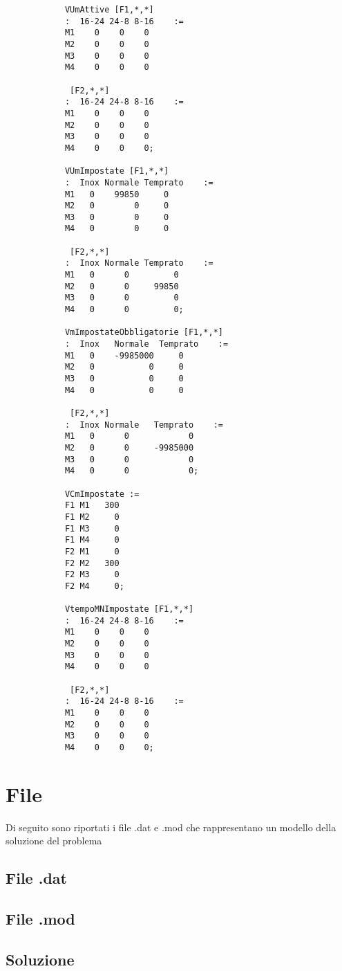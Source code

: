 \documentclass[12pt]{article} %
\begin{document}
\begin{lstlisting}
			VUmAttive [F1,*,*]
			:  16-24 24-8 8-16    :=
			M1    0    0    0
			M2    0    0    0
			M3    0    0    0
			M4    0    0    0

			 [F2,*,*]
			:  16-24 24-8 8-16    :=
			M1    0    0    0
			M2    0    0    0
			M3    0    0    0
			M4    0    0    0;

			VUmImpostate [F1,*,*]
			:  Inox Normale Temprato    :=
			M1   0    99850     0
			M2   0        0     0
			M3   0        0     0
			M4   0        0     0

			 [F2,*,*]
			:  Inox Normale Temprato    :=
			M1   0      0         0
			M2   0      0     99850
			M3   0      0         0
			M4   0      0         0;

			VmImpostateObbligatorie [F1,*,*]
			:  Inox   Normale  Temprato    :=
			M1   0    -9985000     0
			M2   0           0     0
			M3   0           0     0
			M4   0           0     0

			 [F2,*,*]
			:  Inox Normale   Temprato    :=
			M1   0      0            0
			M2   0      0     -9985000
			M3   0      0            0
			M4   0      0            0;

			VCmImpostate :=
			F1 M1   300
			F1 M2     0
			F1 M3     0
			F1 M4     0
			F2 M1     0
			F2 M2   300
			F2 M3     0
			F2 M4     0;

			VtempoMNImpostate [F1,*,*]
			:  16-24 24-8 8-16    :=
			M1    0    0    0
			M2    0    0    0
			M3    0    0    0
			M4    0    0    0

			 [F2,*,*]
			:  16-24 24-8 8-16    :=
			M1    0    0    0
			M2    0    0    0
			M3    0    0    0
			M4    0    0    0;
		\end{lstlisting}



	\newpage

\section{File}
Di seguito sono riportati i file .dat e .mod che rappresentano un modello della soluzione del problema

\subsection{File .dat}


\newpage

\subsection{File .mod}


\newpage

\subsection{Soluzione}

\end{document}
